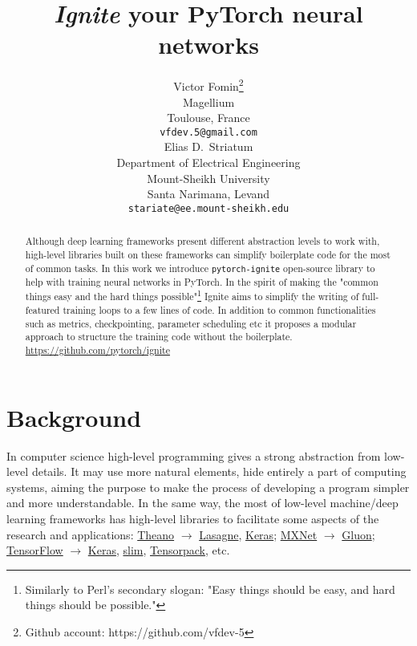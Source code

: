 \documentclass{article}
\title{\emph{Ignite} your PyTorch neural networks}
\author{
  Victor Fomin\thanks{Github account: https://github.com/vfdev-5} \\
  Magellium \\
  Toulouse, France \\
  \texttt{vfdev.5@gmail.com} \\
   \And
 Elias D.~Striatum \\
  Department of Electrical Engineering\\
  Mount-Sheikh University\\
  Santa Narimana, Levand \\
  \texttt{stariate@ee.mount-sheikh.edu} \\
}
\begin{document}
\maketitle

\begin{abstract}
Although deep learning frameworks present different abstraction levels to work with, high-level libraries built on these frameworks
can simplify boilerplate code for the most of common tasks. In this work we introduce \texttt{pytorch-ignite} open-source library to help 
with training neural networks in PyTorch. In the spirit of making the "common things easy and the hard things possible"\footnote{Similarly to Perl's secondary slogan: 
"Easy things should be easy, and hard things should be possible."} Ignite aims to simplify the writing of full-featured training loops
to a few lines of code. In addition to common functionalities such as metrics, checkpointing, parameter scheduling etc it proposes 
a modular approach to structure the training code without the boilerplate. \url{https://github.com/pytorch/ignite}
\end{abstract}


\section{Background}

In computer science high-level programming gives a strong abstraction from low-level details. It may use more natural elements, hide entirely 
a part of computing systems, aiming the purpose to make the process of developing a program simpler and more understandable. 
In the same way, the most of low-level machine/deep learning frameworks has high-level libraries to facilitate some aspects of the research and applications:
\href{https://github.com/Theano/Theano}{Theano} $\rightarrow$ \href{https://github.com/Lasagne/Lasagne}{Lasagne}, 
\href{https://github.com/keras-team/keras}{Keras}; \href{https://github.com/apache/incubator-mxnet}{MXNet} $\rightarrow$ 
\href{https://github.com/gluon-api/gluon-api}{Gluon}; \href{https://www.tensorflow.org/}{TensorFlow} $\rightarrow$ 
\href{https://github.com/keras-team/keras}{Keras}, \href{https://github.com/tensorflow/tensorflow/tree/master/tensorflow/contrib/slim}{slim}, 
\href{https://github.com/tensorpack/tensorpack}{Tensorpack}, etc.
\end{document}
